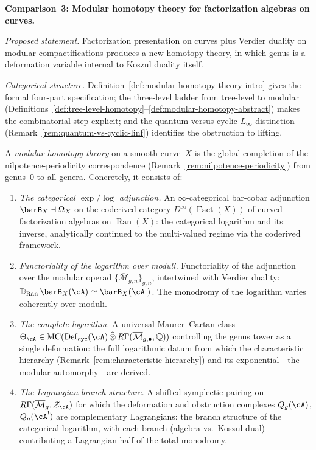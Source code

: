 \medskip

\noindent\textbf{Comparison~3: Modular homotopy theory for factorization
algebras on curves.}

\emph{Proposed statement.}
Factorization presentation on curves plus Verdier duality on
modular compactifications produces a new homotopy theory, in which
genus is a deformation variable internal to Koszul duality itself.

\emph{Categorical structure.}
Definition~\ref{def:modular-homotopy-theory-intro} gives the
formal four-part specification; the three-level ladder from
tree-level to modular
(Definitions~\ref{def:tree-level-homotopy}--\ref{def:modular-homotopy-abstract})
makes the combinatorial step explicit; and the quantum versus cyclic
$L_\infty$ distinction
(Remark~\ref{rem:quantum-vs-cyclic-linf}) identifies the obstruction
to lifting.

\begin{definition}
\label{def:modular-homotopy-theory-working}
A \emph{modular homotopy theory} on a smooth curve~$X$ is the
global completion of the nilpotence-periodicity correspondence
(Remark~\ref{rem:nilpotence-periodicity}) from genus~$0$ to all
genera.  Concretely, it consists of:
\begin{enumerate}[label=\textup{(\roman*)}]
\item \emph{The categorical $\exp/\log$ adjunction.}  An
  $\infty$-categorical bar-cobar adjunction
  $\barB_X \dashv \Omega_X$ on the coderived category
  $D^{\mathrm{co}}(\operatorname{Fact}(X))$ of curved factorization
  algebras on $\operatorname{Ran}(X)$: the categorical logarithm and
  its inverse, analytically continued to the multi-valued regime via
  the coderived framework.
\item \emph{Functoriality of the logarithm over moduli.}
  Functoriality of the adjunction over the modular operad
  $\{\overline{\mathcal{M}}_{g,n}\}_{g,n}$, intertwined with Verdier
  duality:
  $\mathbb{D}_{\operatorname{Ran}}\,\barB_X(\cA)
  \simeq \barB_X(\cA^!)$.  The monodromy of the logarithm varies
  coherently over moduli.
\item \emph{The complete logarithm.}  A universal Maurer--Cartan class
  $\Theta_{\cA} \in
  \operatorname{MC}(\operatorname{Def}_{\mathrm{cyc}}(\cA)
  \,\widehat{\otimes}\,
  R\Gamma(\overline{\mathcal{M}}_{g,\bullet}, \mathbb{Q}))$
  controlling the genus tower as a single deformation: the full
  logarithmic datum from which the characteristic hierarchy
  (Remark~\ref{rem:characteristic-hierarchy}) and
  its exponential---the modular automorphy---are derived.
\item \emph{The Lagrangian branch structure.}  A shifted-symplectic
  pairing on
  $R\Gamma(\overline{\mathcal{M}}_g, \mathcal{Z}_{\cA})$
  for which the deformation and obstruction complexes
  $Q_g(\cA)$, $Q_g(\cA^!)$ are complementary Lagrangians: the
  branch structure of the categorical logarithm, with each
  branch (algebra vs.\ Koszul dual) contributing a Lagrangian
  half of the total monodromy.
\end{enumerate}
\end{definition}


